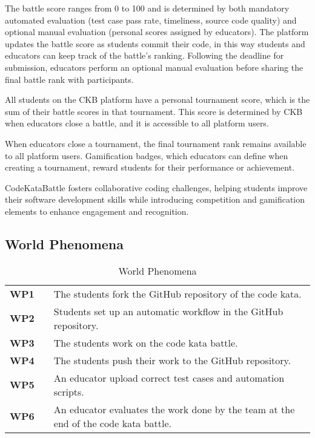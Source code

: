 The battle score ranges from 0 to 100 and is determined by both mandatory automated evaluation (test case pass rate, timeliness, source code quality) and optional manual evaluation (personal scores assigned by educators). 
The platform updates the battle score as students commit their code, in this way students and educators can keep track of the battle's ranking.
Following the deadline for submission, educators perform an optional manual evaluation before sharing the final battle rank with participants.

All students on the CKB platform have a personal tournament score, which is the sum of their battle scores in that tournament. 
This score is determined by CKB when educators close a battle, and it is accessible to all platform users.

When educators close a tournament, the final tournament rank remains available to all platform users.
Gamification badges, which educators can define when creating a tournament, reward students for their performance or achievement.

CodeKataBattle fosters collaborative coding challenges, helping students improve their software development skills while introducing competition and gamification elements to enhance engagement and recognition.

\subsection{World Phenomena}

\begin{table}[H]
    \centering
    \renewcommand{\arraystretch}{1.5} 
    \begin{tabular}{l l p{12cm}}
    \hline
        \textbf{WP1} & & The students fork the GitHub repository of the code kata. \\                                                                                                
        \textbf{WP2} & & Students set up an automatic workflow in the GitHub repository. \\ 
        \textbf{WP3} & & The students work on the code kata battle. \\
        \textbf{WP4} & & The students push their work to the GitHub repository. \\
        \textbf{WP5} & & An educator upload correct test cases and automation scripts. \\
        \textbf{WP6} & & An educator evaluates the work done by the team at the end of the code kata battle. \\
    \hline
    \end{tabular}
    \caption{World Phenomena}
\end{table}


